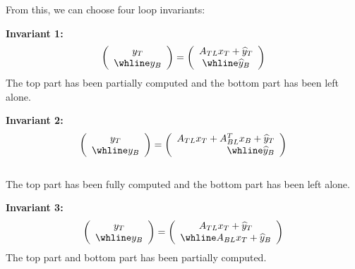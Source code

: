 \documentclass[12pt]{article}
\begin{document}
From this, we can choose four loop invariants:
\begin{description}
	\item
	{\bf Invariant 1:}
\begin{equation}
	\left(\begin{array}{c}
		y_T \\ \whline
		y_B 
	\end{array}\right)  = 
	\left(\begin{array}{c}
		A_{TL} x_T + \widehat y_T \\ \whline 
		\widehat y_B 
	\end{array}\right)
\label{eq:inv1}
\end{equation}
	The top part has been partially computed and the bottom part has been left
alone. 
	\item
	{\bf Invariant 2:}
\begin{equation}
\left(\begin{array}{c}
		y_T \\ \whline
		y_B 
	\end{array}\right)  = 
	\left(\begin{array}{r}
		A_{TL} x_T + A_{BL}^T x_B + \widehat y_T \\ \whline 
		\widehat y_B 
	\end{array}\right)
	\label{eq:inv2}
	\end{equation} \\
	The top part has been fully computed and the bottom part has been left
alone.
\item 
{\bf Invariant 3:}
\begin{equation}
    \left(\begin{array}{c}
        y_T \\ \whline
        y_B 
    \end{array}\right)  = 
    \left(\begin{array}{c}
        A_{TL} x_T + \widehat y_T \\ \whline 
        A_{BL} x_T + \widehat y_B 
    \end{array}\right)
\label{eq:inv3}
\end{equation}
    The top part and bottom part has been partially computed.


\end{description}
\end{document}
